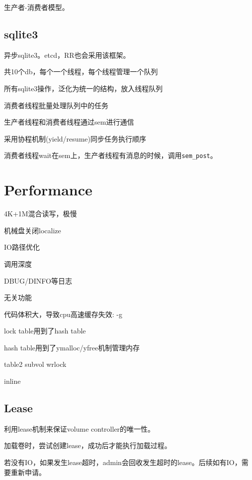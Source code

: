 生产者-消费者模型。

\subsection{sqlite3}

异步sqlite3。etcd，RR也会采用该框架。

\begin{compactitem}
    \item 共10个db，每个一个线程，每个线程管理一个队列
    \item 所有sqlite3操作，泛化为统一的结构，放入线程队列
    \item 消费者线程批量处理队列中的任务
    \item 生产者线程和消费者线程通过sem进行通信
    \item 采用协程机制(yield/resume)同步任务执行顺序
\end{compactitem}

消费者线程wait在sem上，生产者线程有消息的时候，调用\verb|sem_post|。

\section{Performance}

4K+1M混合读写，极慢

机械盘关闭localize

IO路径优化
\begin{enumbox}
\item 调用深度
\item DBUG/DINFO等日志
\item 无关功能
\item 代码体积大，导致cpu高速缓存失效: -g
\item lock table用到了hash table
\item hash table用到了ymalloc/yfree机制管理内存
\item table2 subvol wrlock
\item inline
\end{enumbox}

\subsection{Lease}

利用lease机制来保证volume controller的唯一性。

加载卷时，尝试创建lease，成功后才能执行加载过程。

若没有IO，如果发生lease超时，admin会回收发生超时的lease。后续如有IO，需要重新申请。

